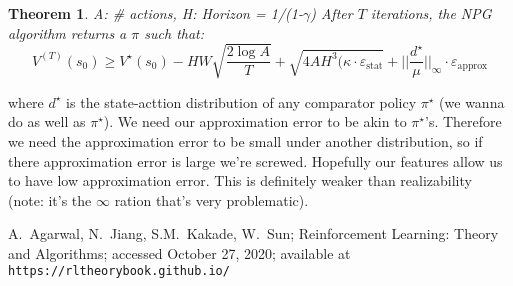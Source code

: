 \documentclass[12pt,reqno]{amsart}
\newtheorem{theorem}{Theorem}[section]
\newcommand\eps{\varepsilon}
\begin{document}
\begin{shaded}
\begin{theorem}
A: \# actions, H: Horizon = 1/(1-$\gamma$)
\newline
After $T$ iterations, the NPG algorithm returns a $\pi$ such that:
\begin{equation}
V^{(T)}(s_0) \geq V^{\star}(s_0) - HW \sqrt{\frac{2 \log A}{T}} + \sqrt{4AH^3(\kappa \cdot \eps_{\textrm{stat}}} + ||\frac{d^\star}{\mu}||_\infty \cdot \eps_{\textrm{approx}}
\end{equation}
\end{theorem}
\end{shaded}
where $d^\star$ is the state-acttion distribution of any comparator policy $\pi^{\star}$ (we wanna do as well as $\pi^\star$). We need our approximation error to be akin to $\pi^\star$'s. Therefore we need the approximation error to be small under another distribution, so if there approximation error is large we're screwed. Hopefully our features allow us to have low approximation error. This is definitely weaker than realizability (note: it's the $\infty$ ration that's very problematic).
\begin{thebibliography}{99}

 A.\ Agarwal, N.\ Jiang, S.M.\ Kakade, W.\ Sun; Reinforcement Learning: Theory and Algorithms; accessed October 27, 2020; available at \texttt{https://rltheorybook.github.io/}
\end{thebibliography}
\end{document}
